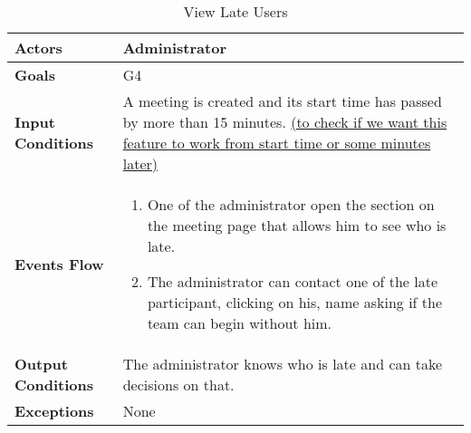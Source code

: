 \begin{table}[H]
	\centering
	\def\arraystretch{1.5}
	\begin{tabular}{|p{7cm}|p{7cm}|}
		\hline
		\textbf{Actors}            & Administrator    \\ \hline
		\textbf{Goals}             & G4           \\ \hline
		\textbf{Input Conditions}  & A meeting is created and its start time has passed by more than 15 minutes. \underline{(to check if we want this feature to work from start time or some minutes later)}           \\ \hline
		\textbf{Events Flow}       &  
		\begin{enumerate}[topsep=0pt, leftmargin=*]
			\item One of the administrator open the section on the meeting page that allows him to see who is late.
			\item The administrator can contact one of the late participant, clicking on his, name asking if the team can begin without him.
		\end{enumerate}             \\ \hline
		\textbf{Output Conditions} & The administrator knows who is late and can take decisions on that.           \\ \hline
		\textbf{Exceptions}        & None           \\ \hline
	\end{tabular}
	\caption{View Late Users}
\end{table}

